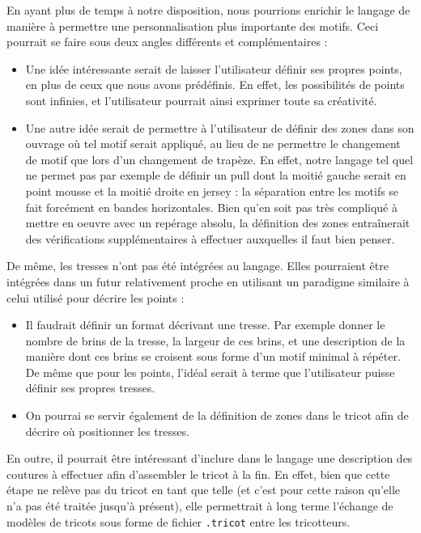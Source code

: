 \documentclass{article}
\begin{document}
En ayant plus de temps à notre disposition, nous pourrions enrichir le langage de manière à permettre une personnalisation plus importante des motifs. 
Ceci pourrait se faire sous deux angles différents et complémentaires :
\begin{itemize}
 \item Une idée intéressante serait de laisser l'utilisateur définir ses propres points, en plus de ceux que nous avons prédéfinis. En effet, les possibilités de points sont infinies, et l'utilisateur pourrait ainsi exprimer toute sa créativité.
 \item Une autre idée serait de permettre à l'utilisateur de définir des zones dans son ouvrage où tel motif serait appliqué, au lieu de ne permettre le changement de motif que lors d'un changement de trapèze. En effet, notre langage tel quel ne permet pas par exemple de définir un pull dont la moitié gauche serait en point mousse et la moitié droite en jersey : la séparation entre les motifs se fait forcément en bandes horizontales. Bien qu'en soit pas très compliqué à mettre en oeuvre avec un repérage absolu, la définition des zones entraînerait des vérifications supplémentaires à effectuer auxquelles il faut bien penser.\\
\end{itemize}

De même, les tresses n'ont pas été intégrées au langage. Elles pourraient être intégrées dans un futur relativement proche en utilisant un paradigme similaire à celui utilisé pour décrire les points :
\begin{itemize}
 \item Il faudrait définir un format décrivant une tresse. Par exemple donner le nombre de brins de la tresse, la largeur de ces brins, et une description de la manière dont ces brins se croisent sous forme d'un motif minimal à répéter. De même que pour les points, l'idéal serait à terme que l'utilisateur puisse définir ses propres tresses.
 \item On pourrai se servir également de la définition de zones dans le tricot afin de décrire où positionner les tresses. \\
\end{itemize}

En outre, il pourrait être intéressant d'inclure dans le langage une description des coutures à effectuer afin d'assembler le tricot à la fin. En effet, bien que cette étape ne relève pas du tricot en tant que telle (et c'est pour cette raison qu'elle n'a pas été traitée jusqu'à présent), elle permettrait à long terme l'échange de modèles de tricots sous forme de fichier \texttt{.tricot} entre les tricotteurs.
\end{document}
